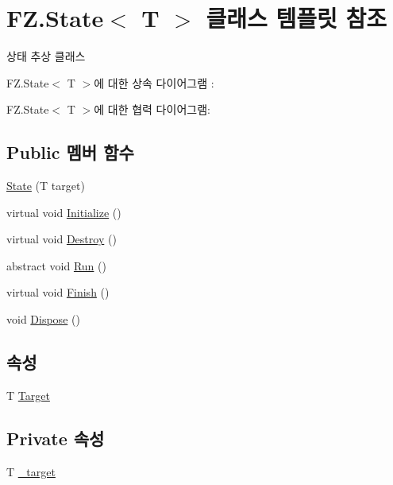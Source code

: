 \hypertarget{class_f_z_1_1_state}{}\section{F\+Z.\+State$<$ T $>$ 클래스 템플릿 참조}
\label{class_f_z_1_1_state}


상태 추상 클래스  




F\+Z.\+State$<$ T $>$에 대한 상속 다이어그램 \+: 


F\+Z.\+State$<$ T $>$에 대한 협력 다이어그램\+:
\subsection*{Public 멤버 함수}
\begin{DoxyCompactItemize}
\item 
\hyperlink{class_f_z_1_1_state_af41ff99fa6cd69f1b8e11ca329c73f27}{State} (T target)
\item 
virtual void \hyperlink{class_f_z_1_1_state_a27ac6fd2e844476017b35aa781d73c8c}{Initialize} ()
\item 
virtual void \hyperlink{class_f_z_1_1_state_aa85fdf4a5495d6d5d3ed4aeda3497c8a}{Destroy} ()
\item 
abstract void \hyperlink{class_f_z_1_1_state_acaf1584680a2e69e2a4da20574723981}{Run} ()
\item 
virtual void \hyperlink{class_f_z_1_1_state_a288bb8c3fceee4bf03f01e295dcef1be}{Finish} ()
\item 
void \hyperlink{class_f_z_1_1_state_a598887d3fbb412fada132dc1c079b25b}{Dispose} ()
\end{DoxyCompactItemize}
\subsection*{속성}
\begin{DoxyCompactItemize}
\item 
T \hyperlink{class_f_z_1_1_state_a6927f5c9f2517052f9dc5596188e9d95}{Target}
\end{DoxyCompactItemize}
\subsection*{Private 속성}
\begin{DoxyCompactItemize}
\item 
T \hyperlink{class_f_z_1_1_state_aff2ae4a7940bd3e363e98e3c0d76d011}{\+\_\+target}
\end{DoxyCompactItemize}


